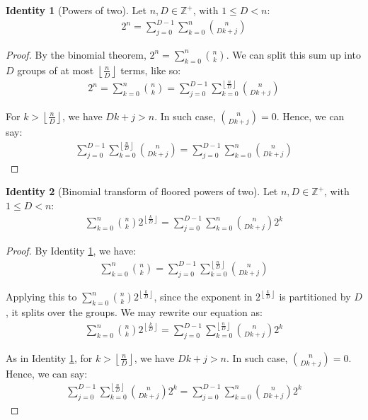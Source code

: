 \documentclass{article}
\theoremstyle{plain}
\theoremstyle{definition}
\newtheorem{identity}{Identity}
\newcommand{\floor}[1]{\left\lfloor #1 \right\rfloor}
\newcommand{\Z}{\mathbb{Z}}
\begin{document}
\begin{identity}[Powers of two] \label{identity:powersoftwobinomialgroups}
Let $n, D \in \Z^+$, with $1 \leq D < n$:
\begin{align}
    2^n = \sum_{j=0}^{D-1} \sum_{k=0}^{n} \binom{n}{D k + j}
\end{align}
\end{identity}
\begin{proof}
    By the binomial theorem, $2^n = \sum_{k=0}^{n} \binom{n}{k}$. We can split this sum up into $D$ groups of at most $\floor{\frac{n}{D}}$ terms, like so:
    \begin{align}
        2^n = \sum_{k=0}^{n} \binom{n}{k} = \sum_{j=0}^{D-1} \sum_{k=0}^{\floor{\frac{n}{D}}} \binom{n}{D k + j}
    \end{align}

    For $k > \floor{\frac{n}{D}}$, we have $D k + j > n$. In such case, $\binom{n}{D k + j} = 0$. Hence, we can say:
    \begin{align}
        \sum_{j=0}^{D-1} \sum_{k=0}^{\floor{\frac{n}{D}}} \binom{n}{D k + j} = \sum_{j=0}^{D-1} \sum_{k=0}^{n} \binom{n}{D k + j}
    \end{align}
\end{proof}

\begin{identity}[Binomial transform of floored powers of two] \label{identity:flooredpowersoftwobinomialgroups}
Let $n, D \in \Z^+$, with $1 \leq D < n$:
\begin{align}
    \sum_{k=0}^{n} \binom{n}{k} 2^{\floor{\frac{k}{D}}} = \sum_{j=0}^{D-1} \sum_{k=0}^{n} \binom{n}{D k + j} 2^{k}
\end{align}
\end{identity}
\begin{proof}
    By Identity \ref{identity:powersoftwobinomialgroups}, we have:
    \begin{align}
        \sum_{k=0}^{n} \binom{n}{k} = \sum_{j=0}^{D-1} \sum_{k=0}^{\floor{\frac{n}{D}}} \binom{n}{D k + j}
    \end{align}

    Applying this to $\sum_{k=0}^{n} \binom{n}{k} 2^{\floor{\frac{k}{D}}}$, since the exponent in $2^{\floor{\frac{k}{D}}}$ is partitioned by $D$, it splits over the groups. We may rewrite our equation as:
    \begin{align}
        \sum_{k=0}^{n} \binom{n}{k} 2^{\floor{\frac{k}{D}}} = \sum_{j=0}^{D-1} \sum_{k=0}^{\floor{\frac{n}{D}}} \binom{n}{D k + j} 2^{k}
    \end{align}

    As in Identity \ref{identity:powersoftwobinomialgroups}, for $k > \floor{\frac{n}{D}}$, we have $D k + j > n$. In such case, $\binom{n}{D k + j} = 0$. Hence, we can say:
    \begin{align}
        \sum_{j=0}^{D-1} \sum_{k=0}^{\floor{\frac{n}{D}}} \binom{n}{D k + j} 2^{k} = \sum_{j=0}^{D-1} \sum_{k=0}^{n} \binom{n}{D k + j} 2^{k}
    \end{align}
\end{proof}
\end{document}
